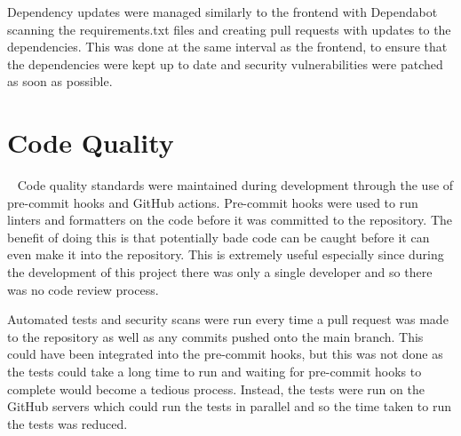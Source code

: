 Dependency updates were managed similarly to the frontend with Dependabot scanning the requirements.txt files and creating pull requests with updates to the dependencies. This was done at the same interval as the frontend, to ensure that the dependencies were kept up to date and security vulnerabilities were patched as soon as possible.

\section{Code Quality}~\label{sec:code-quality}
Code quality standards were maintained during development through the use of pre-commit hooks and GitHub actions. Pre-commit hooks were used to run linters and formatters on the code before it was committed to the repository. The benefit of doing this is that potentially bade code can be caught before it can even make it into the repository. This is extremely useful especially since during the development of this project there was only a single developer and so there was no code review process.

Automated tests and security scans were run every time a pull request was made to the repository as well as any commits pushed onto the main branch. This could have been integrated into the pre-commit hooks, but this was not done as the tests could take a long time to run and waiting for pre-commit hooks to complete would become a tedious process. Instead, the tests were run on the GitHub servers which could run the tests in parallel and so the time taken to run the tests was reduced.
